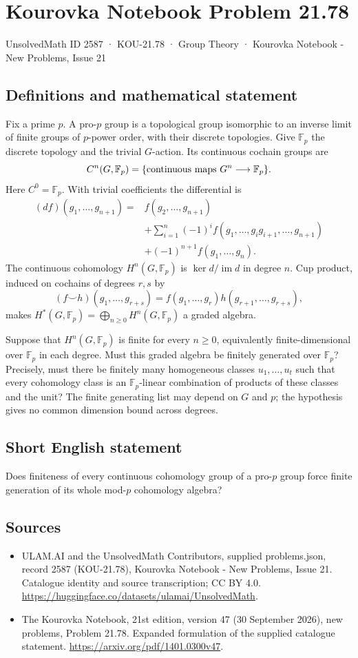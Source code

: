 \documentclass[11pt,a4paper]{article}
\begin{document}
\section*{Kourovka Notebook Problem 21.78}\label{2587}
{\small UnsolvedMath ID 2587 · KOU-21.78 · Group Theory · Kourovka Notebook - New Problems, Issue 21}
\subsection{Definitions and mathematical statement}
Fix a prime $p$. A pro-$p$ group is a topological group isomorphic to an inverse limit of finite groups of $p$-power order, with their discrete topologies. Give $\mathbb F_p$ the discrete topology and the trivial $G$-action. Its continuous cochain groups are
\[
 C^n(G,\mathbb F_p)=\{\hbox{continuous maps }G^n\longrightarrow\mathbb F_p\}.
\]
Here $C^0=\mathbb F_p$. With trivial coefficients the differential is
\[
\begin{split}
(df)(g_1,\ldots,g_{n+1})={}&f(g_2,\ldots,g_{n+1})\\
&+\sum_{i=1}^n(-1)^if(g_1,\ldots,g_ig_{i+1},\ldots,g_{n+1})\\
&+(-1)^{n+1}f(g_1,\ldots,g_n).
\end{split}
\]
The continuous cohomology $H^n(G,\mathbb F_p)$ is $\ker d/\operatorname{im}d$ in degree $n$. Cup product, induced on cochains of degrees $r,s$ by
\[
 (f\smile h)(g_1,\ldots,g_{r+s})
 =f(g_1,\ldots,g_r)h(g_{r+1},\ldots,g_{r+s}),
\]
makes $H^*(G,\mathbb F_p)=\bigoplus_{n\ge0}H^n(G,\mathbb F_p)$ a graded algebra.

Suppose that $H^n(G,\mathbb F_p)$ is finite for every $n\ge0$, equivalently finite-dimensional over $\mathbb F_p$ in each degree. Must this graded algebra be finitely generated over $\mathbb F_p$? Precisely, must there be finitely many homogeneous classes $u_1,\ldots,u_t$ such that every cohomology class is an $\mathbb F_p$-linear combination of products of these classes and the unit? The finite generating list may depend on $G$ and $p$; the hypothesis gives no common dimension bound across degrees.
\subsection{Short English statement}
Does finiteness of every continuous cohomology group of a pro-$p$ group force finite generation of its whole mod-$p$ cohomology algebra?
\subsection{Sources}
\begin{itemize}
\item[S1] ULAM.AI and the UnsolvedMath Contributors, supplied problems.json, record 2587 (KOU-21.78), Kourovka Notebook - New Problems, Issue 21. Catalogue identity and source transcription; CC BY 4.0.
\url{https://huggingface.co/datasets/ulamai/UnsolvedMath}.
\item[S2] The Kourovka Notebook, 21st edition, version 47 (30 September 2026), new problems, Problem 21.78. Expanded formulation of the supplied catalogue statement.
\url{https://arxiv.org/pdf/1401.0300v47}.
\end{itemize}
\end{document}
